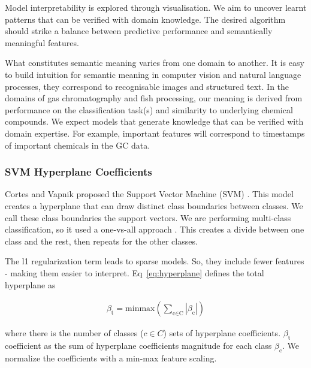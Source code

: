 \documentclass[runningheads]{llncs}
\begin{document}
Model interpretability is explored through visualisation.
We aim to uncover learnt patterns that can be verified with domain knowledge.
The desired algorithm should strike a balance between predictive performance and semantically meaningful features.

What constitutes semantic meaning varies from one domain to another.
It is easy to build intuition for semantic meaning in computer vision and natural language processes, they correspond to recognisable images and structured text.
In the domains of gas chromatography and fish processing, our meaning is derived from performance on the classification task(s) and similarity to underlying chemical compounds.
We expect models that generate knowledge that can be verified with domain expertise. 
For example, important features will correspond to timestamps of important chemicals in the GC data.


\subsubsection{SVM Hyperplane Coefficients}

Cortes and Vapnik proposed the Support Vector Machine (SVM) \cite{cortes1995support}.
This model creates a hyperplane that can draw distinct class boundaries between classes.
We call these class boundaries the support vectors.
We are performing multi-class classification, so it used a one-vs-all approach \cite{sklearn2021feature}.
This creates a divide between one class and the rest, then repeats for the other classes.

The l1 regularization term leads to sparse models.
So, they include fewer features - making them easier to interpret.
Eq~\ref{eq:hyperplane} defines the total hyperplane as

\begin{align}\label{eq:hyperplane}
  \beta_{\text{t}} = \text{minmax}(
  \sum_{\text{c} \in \text{C}}
  |\beta_{\text{c}}|
  )
\end{align}

where there is the number of classes ($c \in C$) sets of hyperplane coefficients.
$\beta_{\text{t}}$ coefficient as the sum of hyperplane coefficients magnitude for each class $\beta_{\text{c}}$.
We normalize the coefficients with a min-max feature scaling.
\end{document}
